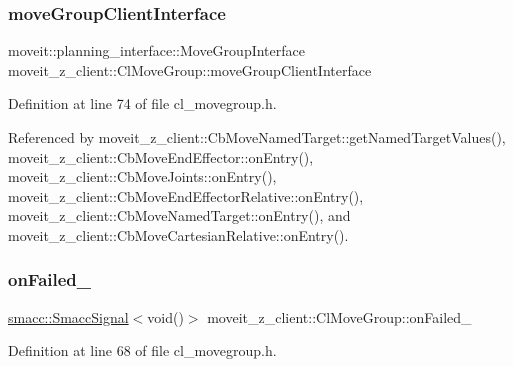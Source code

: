 \subsubsection{\texorpdfstring{move\+Group\+Client\+Interface}{moveGroupClientInterface}}
{\footnotesize\ttfamily moveit\+::planning\+\_\+interface\+::\+Move\+Group\+Interface moveit\+\_\+z\+\_\+client\+::\+Cl\+Move\+Group\+::move\+Group\+Client\+Interface}



Definition at line 74 of file cl\+\_\+movegroup.\+h.



Referenced by moveit\+\_\+z\+\_\+client\+::\+Cb\+Move\+Named\+Target\+::get\+Named\+Target\+Values(), moveit\+\_\+z\+\_\+client\+::\+Cb\+Move\+End\+Effector\+::on\+Entry(), moveit\+\_\+z\+\_\+client\+::\+Cb\+Move\+Joints\+::on\+Entry(), moveit\+\_\+z\+\_\+client\+::\+Cb\+Move\+End\+Effector\+Relative\+::on\+Entry(), moveit\+\_\+z\+\_\+client\+::\+Cb\+Move\+Named\+Target\+::on\+Entry(), and moveit\+\_\+z\+\_\+client\+::\+Cb\+Move\+Cartesian\+Relative\+::on\+Entry().

\mbox{\label{classmoveit__z__client_1_1ClMoveGroup_ab9f19c609cfa111748bc16d497dffe9a}} 
\subsubsection{\texorpdfstring{on\+Failed\+\_\+}{onFailed\_}}
{\footnotesize\ttfamily \hyperlink{classsmacc_1_1SmaccSignal}{smacc\+::\+Smacc\+Signal}$<$void()$>$ moveit\+\_\+z\+\_\+client\+::\+Cl\+Move\+Group\+::on\+Failed\+\_\+\hspace{0.3cm}{\ttfamily [private]}}



Definition at line 68 of file cl\+\_\+movegroup.\+h.

\mbox{\label{classmoveit__z__client_1_1ClMoveGroup_a77804970cc1e2ae64e26dabbf556352d}} 
